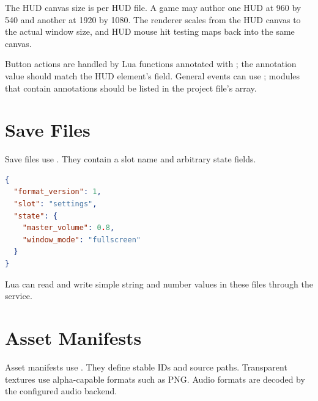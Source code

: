 The HUD canvas size is per HUD file. A game may author one HUD at 960 by 540 and another at 1920 by 1080. The renderer scales from the HUD canvas to the actual window size, and HUD mouse hit testing maps back into the same canvas.

Button actions are handled by Lua functions annotated with ; the annotation value should match the HUD element's  field. General events can use ; modules that contain annotations should be listed in the project file's  array.

\section{Save Files}

Save files use . They contain a slot name and arbitrary state fields.

\begin{lstlisting}[language=json]
{
  "format_version": 1,
  "slot": "settings",
  "state": {
    "master_volume": 0.8,
    "window_mode": "fullscreen"
  }
}
\end{lstlisting}

Lua can read and write simple string and number values in these files through the  service.

\section{Asset Manifests}

Asset manifests use . They define stable 
IDs and source paths. Transparent textures use alpha-capable formats such as
PNG. Audio formats are decoded by the configured audio backend.

